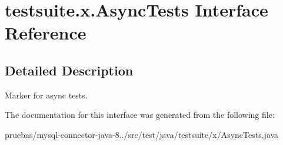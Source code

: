 \hypertarget{interfacetestsuite_1_1x_1_1_async_tests}{}\section{testsuite.\+x.\+Async\+Tests Interface Reference}
\label{interfacetestsuite_1_1x_1_1_async_tests}


\subsection{Detailed Description}
Marker for async tests. 

The documentation for this interface was generated from the following file\+:\begin{DoxyCompactItemize}
\item 
pruebas/mysql-\/connector-\/java-\/8../src/test/java/testsuite/x/Async\+Tests.\+java\end{DoxyCompactItemize}
